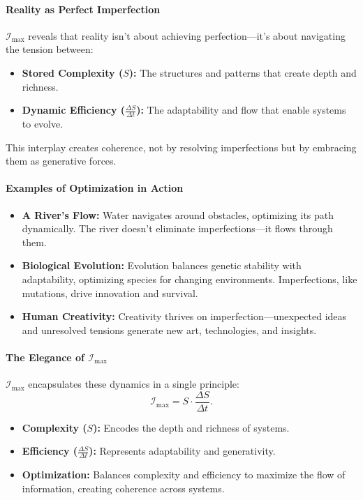 \documentclass[12pt]{article}
\begin{document}
\paragraph{Reality as Perfect Imperfection}
\(\mathcal{I}_{\text{max}}\) reveals that reality isn’t about achieving perfection—it’s about navigating the tension between:
\begin{itemize}
    \item \textbf{Stored Complexity (\(S\)):}  
    The structures and patterns that create depth and richness.
    \item \textbf{Dynamic Efficiency (\(\frac{\Delta S}{\Delta t}\)):}  
    The adaptability and flow that enable systems to evolve.
\end{itemize}
This interplay creates coherence, not by resolving imperfections but by embracing them as generative forces.

\paragraph{Examples of Optimization in Action}
\begin{itemize}
    \item \textbf{A River’s Flow:}  
    Water navigates around obstacles, optimizing its path dynamically. The river doesn’t eliminate imperfections—it flows through them.
    \item \textbf{Biological Evolution:}  
    Evolution balances genetic stability with adaptability, optimizing species for changing environments. Imperfections, like mutations, drive innovation and survival.
    \item \textbf{Human Creativity:}  
    Creativity thrives on imperfection—unexpected ideas and unresolved tensions generate new art, technologies, and insights.
\end{itemize}

\paragraph{The Elegance of \(\mathcal{I}_{\text{max}}\)}
\(\mathcal{I}_{\text{max}}\) encapsulates these dynamics in a single principle:
\[
\mathcal{I}_{\text{max}} = S \cdot \frac{\Delta S}{\Delta t}.
\]
\begin{itemize}
    \item \textbf{Complexity (\(S\)):}  
    Encodes the depth and richness of systems.
    \item \textbf{Efficiency (\(\frac{\Delta S}{\Delta t}\)):}  
    Represents adaptability and generativity.
    \item \textbf{Optimization:}  
    Balances complexity and efficiency to maximize the flow of information, creating coherence across systems.
\end{itemize}
\end{document}
